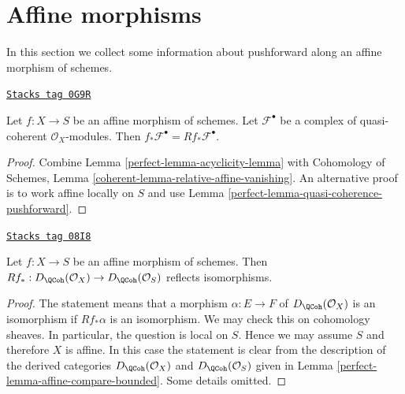 \section{Affine morphisms}
\label{perfect-section-affine-morphisms}
In this section we collect some information about pushforward
along an affine morphism of schemes.

\begin{lemma}
\label{perfect-lemma-pushforward-affine-morphism}
\href{https://stacks.math.columbia.edu/tag/0G9R}{\texttt{Stacks tag 0G9R}}

Let $f : X \to S$ be an affine morphism of schemes. Let $\mathcal{F}^\bullet$
be a complex of quasi-coherent $\mathcal{O}_X$-modules. Then
$f_*\mathcal{F}^\bullet = Rf_*\mathcal{F}^\bullet$.
\end{lemma}

\begin{proof}

Combine Lemma \ref{perfect-lemma-acyclicity-lemma} with
Cohomology of Schemes, Lemma \ref{coherent-lemma-relative-affine-vanishing}.
An alternative proof is to work affine locally on $S$
and use Lemma \ref{perfect-lemma-quasi-coherence-pushforward}.
\end{proof}

\begin{lemma}
\label{perfect-lemma-affine-morphism}
\href{https://stacks.math.columbia.edu/tag/08I8}{\texttt{Stacks tag 08I8}}

Let $f : X \to S$ be an affine morphism of schemes.
Then
$Rf_* : D_\QCoh(\mathcal{O}_X) \to D_\QCoh(\mathcal{O}_S)$
reflects isomorphisms.
\end{lemma}

\begin{proof}

The statement means that a morphism $\alpha : E \to F$ of
$D_\QCoh(\mathcal{O}_X)$ is an isomorphism if
$Rf_*\alpha$ is an isomorphism. We may check this on cohomology sheaves.
In particular, the question is local on $S$. Hence we may assume $S$
and therefore $X$ is affine. In this case the statement is clear from
the description of the derived categories
$D_\QCoh(\mathcal{O}_X)$ and
$D_\QCoh(\mathcal{O}_S)$ given in
Lemma \ref{perfect-lemma-affine-compare-bounded}.
Some details omitted.
\end{proof}

